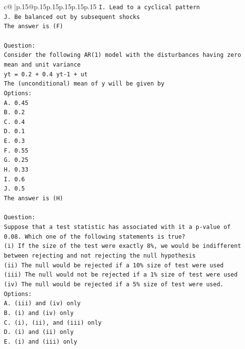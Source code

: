 \documentclass{article}
\begin{document}
{\begin{supertabular}{c@{$\;$}|p{.15\linewidth}@{}p{.15\linewidth}p{.15\linewidth}p{.15\linewidth}p{.15\linewidth}p{.15\linewidth}}
{{{\texttt{I. Lead to a cyclical pattern} \\
\texttt{J. Be balanced out by subsequent shocks} \\
\texttt{The answer is (F)} \\
\\ 
\texttt{Question:} \\
\texttt{Consider the following AR(1) model with the disturbances having zero mean and unit variance} \\
\texttt{yt = 0.2 + 0.4 yt{-}1 + ut} \\
\texttt{The (unconditional) mean of y will be given by} \\
\texttt{Options:} \\
\texttt{A. 0.45} \\
\texttt{B. 0.2} \\
\texttt{C. 0.4} \\
\texttt{D. 0.1} \\
\texttt{E. 0.3} \\
\texttt{F. 0.55} \\
\texttt{G. 0.25} \\
\texttt{H. 0.33} \\
\texttt{I. 0.6} \\
\texttt{J. 0.5} \\
\texttt{The answer is (H)} \\
\\ 
\texttt{Question:} \\
\texttt{Suppose that a test statistic has associated with it a p{-}value of 0.08. Which one of the following statements is true?} \\
\texttt{(i) If the size of the test were exactly 8\%, we would be indifferent between rejecting and not rejecting the null hypothesis} \\
\texttt{(ii) The null would be rejected if a 10\% size of test were used} \\
\texttt{(iii) The null would not be rejected if a 1\% size of test were used} \\
\texttt{(iv) The null would be rejected if a 5\% size of test were used.} \\
\texttt{Options:} \\
\texttt{A. (iii) and (iv) only} \\
\texttt{B. (i) and (iv) only} \\
\texttt{C. (i), (ii), and (iii) only} \\
\texttt{D. (i) and (ii) only} \\
\texttt{E. (i) and (iii) only} \\
}}}
\end{supertabular}}
\end{document}
